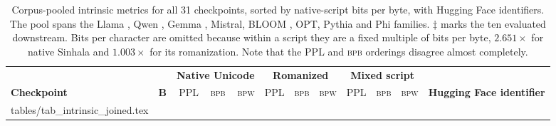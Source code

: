 \documentclass[11pt]{article}
\makeatletter
\newcommand{\bpb}{\textsc{bpb}}
\newcommand{\bpw}{\textsc{bpw}}
\newcommand{\rows}[1]{\@@input #1 }
\makeatother
\begin{document}
\begin{table}[h]
\centering\scriptsize
\setlength{\tabcolsep}{3pt}
\begin{tabular}{@{}lr rrr rrr rrr l@{}}
\toprule
& & \multicolumn{3}{c}{\textbf{Native Unicode}} & \multicolumn{3}{c}{\textbf{Romanized}}
& \multicolumn{3}{c}{\textbf{Mixed script}} & \\
\cmidrule(lr){3-5}\cmidrule(lr){6-8}\cmidrule(lr){9-11}
\textbf{Checkpoint} & \textbf{B} & PPL & \bpb{} & \bpw{}
& PPL & \bpb{} & \bpw{} & PPL & \bpb{} & \bpw{} & \textbf{Hugging Face identifier} \\
\midrule
\rows{tables/tab_intrinsic_joined.tex}
\bottomrule
\end{tabular}
\caption{Corpus-pooled intrinsic metrics for all 31 checkpoints, sorted by native-script
bits per byte, with Hugging Face identifiers. The pool spans the Llama
\citep{grattafiori-etal-2024-llama3}, Qwen \citep{yang-etal-2024-qwen2,
yang-etal-2025-qwen3}, Gemma \citep{gemmateam-2024-gemma2}, Mistral, BLOOM
\citep{lescao-etal-2023-bloom, laurencon-etal-2023-roots}, OPT, Pythia
\citep{biderman-etal-2023-pythia} and Phi \citep{abdin-etal-2024-phi4} families. $\ddagger$ marks the ten
evaluated downstream. Bits per character are omitted because within a script they are
a fixed multiple of bits per byte, $2.651\times$ for native Sinhala and
$1.003\times$ for its romanization. Note that the PPL and \bpb{} orderings disagree
almost completely.}
\label{tab:intrinsicfull}
\end{table}
\end{document}
